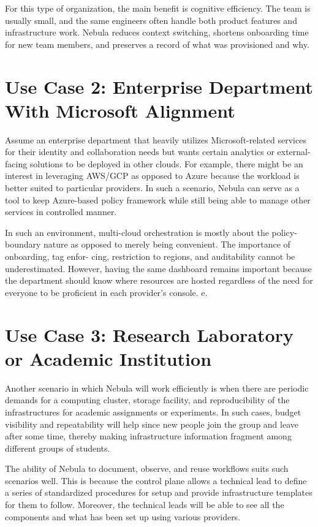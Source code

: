 For this type of organization, the main benefit is cognitive efficiency. The team is usually small, and the same engineers often handle both product features and infrastructure work. Nebula reduces context switching, shortens onboarding time for new team members, and preserves a record of what was provisioned and why.

\section{Use Case 2: Enterprise Department With Microsoft Alignment}


Assume an enterprise department that heavily utilizes Microsoft-related services for their identity and collaboration needs but wants certain analytics or external-facing solutions to be deployed in other clouds. For example, there might be an interest in leveraging AWS/GCP as opposed to Azure because the workload is better suited to particular providers. In such a scenario, Nebula can serve as a tool to keep Azure-based policy framework while still being able to manage other services in controlled manner.


In such an environment, multi-cloud orchestration is mostly about the policy-boundary nature as opposed to merely being convenient. The importance of onboarding, tag enfor- cing, restriction to regions, and auditability cannot be underestimated. However, having the same dashboard remains important because the department should know where resources are hosted regardless of the need for everyone to be proficient in each provider's console.
e.

\section{Use Case 3: Research Laboratory or Academic Institution}


Another scenario in which Nebula will work efficiently is when there are periodic demands for a computing cluster, storage facility, and reproducibility of the infrastructures for academic assignments or experiments. In such cases, budget visibility and repeatability will help since new people join the group and leave after some time, thereby making infrastructure information fragment among different groups of students.


The ability of Nebula to document, observe, and reuse workflows suits such scenarios well. This is because the control plane allows a technical lead to define a series of standardized procedures for setup and provide infrastructure templates for them to follow. Moreover, the technical leads will be able to see all the components and what has been set up using various providers.


